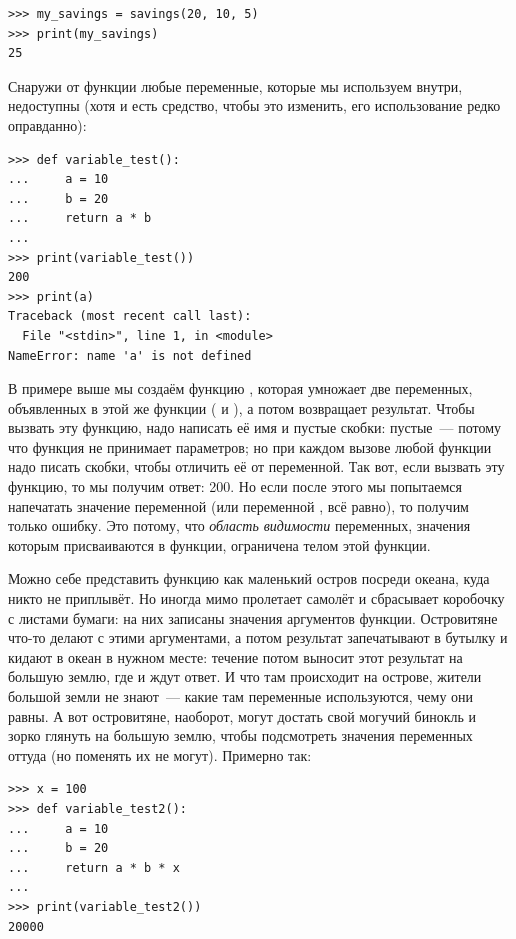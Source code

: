 \begin{listing}
\begin{verbatim}
>>> my_savings = savings(20, 10, 5)
>>> print(my_savings)
25
\end{verbatim}
\end{listing}

Снаружи от функции любые переменные, которые мы используем внутри, недоступны (хотя и есть средство, чтобы это изменить, его использование редко оправданно):

\begin{listing}
\begin{verbatim}
>>> def variable_test():
...     a = 10
...     b = 20
...     return a * b
...
>>> print(variable_test())
200
>>> print(a)
Traceback (most recent call last):
  File "<stdin>", line 1, in <module>
NameError: name 'a' is not defined
\end{verbatim}
\end{listing} 

В примере выше мы создаём функцию , которая умножает две переменных, объявленных в этой же функции ( и ), а потом возвращает результат. Чтобы вызвать эту функцию, надо написать её имя и пустые скобки: пустые — потому что функция не принимает параметров; но при каждом вызове любой функции надо писать скобки, чтобы отличить её от переменной. Так вот, если вызвать эту функцию, то мы получим ответ: 200. Но если после этого мы попытаемся напечатать значение переменной  (или переменной , всё равно), то получим только ошибку. Это потому, что \emph{область видимости} переменных, значения которым присваиваются в функции, ограничена телом этой функции.

Можно себе представить функцию как маленький остров посреди океана, куда никто не приплывёт. Но иногда мимо пролетает самолёт и сбрасывает коробочку с листами бумаги: на них записаны значения аргументов функции. Островитяне что-то делают с этими аргументами, а потом результат запечатывают в бутылку и кидают в океан в нужном месте: течение потом выносит этот результат на большую землю, где и ждут ответ. И что там происходит на острове, жители большой земли не знают — какие там переменные используются, чему они равны. А вот островитяне, наоборот, могут достать свой могучий бинокль и зорко глянуть на большую землю, чтобы подсмотреть значения переменных оттуда (но поменять их не могут). Примерно так:

\begin{listing}
\begin{verbatim}
>>> x = 100
>>> def variable_test2():
...     a = 10
...     b = 20
...     return a * b * x
... 
>>> print(variable_test2())
20000
\end{verbatim}
\end{listing}

